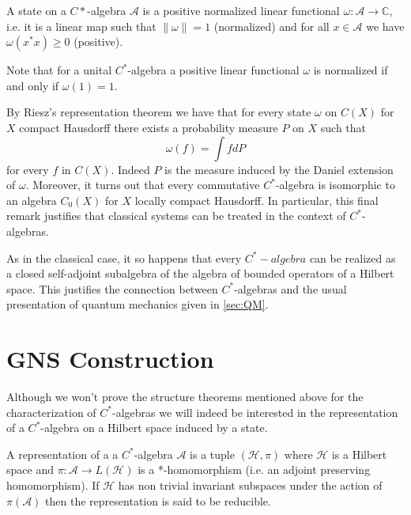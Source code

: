 \begin{definition}
A state on a $C*$-algebra $\mathcal{A}$ is a positive normalized linear functional $\omega:\mathcal{A}\rightarrow \mathbb{C}$, i.e. it is a linear map such that $\|\omega\| = 1$ (normalized) and for all $x\in\mathcal{A}$ we have $\omega(x^*x)\geq 0$ (positive).
\end{definition}  

Note that for a unital $C^*$-algebra a positive linear functional $\omega$ is normalized if and only if $\omega(1)=1$.

\begin{example}
By Riesz's representation theorem \cite{Hewitt1975} we have that for every state $\omega$ on $C(X)$ for $X$ compact Hausdorff there exists a probability measure $P$ on $X$ such that
\begin{equation}
\omega (f)=\int fdP
\end{equation}    
for every $f$ in $C(X)$. Indeed $P$ is the measure induced by the Daniel extension of $\omega$. Moreover, it turns out that every commutative $C^*$-algebra is isomorphic to an algebra $C_0(X)$ for $X$ locally compact Hausdorff\cite{Bratteli1997}. In particular, this final remark justifies that classical systems can be treated in the context of $C^*$-algebras. 
\end{example}

\begin{example}
As in the classical case, it so happens that every $C^*-algebra$ can be realized as a closed self-adjoint subalgebra of the algebra of bounded operators of a Hilbert space\cite{Bratteli1997}. This justifies the connection between $C^*$-algebras and the usual presentation of quantum mechanics given in \ref{sec:QM}.
\end{example}

\section{GNS Construction}

Although we won't prove the structure theorems mentioned above for the characterization of $C^*$-algebras we will indeed be interested in the representation of a $C^*$-algebra on a Hilbert space induced by a state. 

\begin{definition}
A representation of a a $C^*$-algebra $\mathcal{A}$ is a tuple $(\mathcal{H},\pi)$ where $\mathcal{H}$ is a Hilbert space and $\pi:\mathcal{A}\rightarrow L(\mathcal{H})$ is a *-homomorphism (i.e. an adjoint preserving homomorphism). If $\mathcal{H}$ has non trivial invariant subspaces under the action of $\pi(\mathcal{A})$ then the representation is said to be reducible.
\end{definition}

